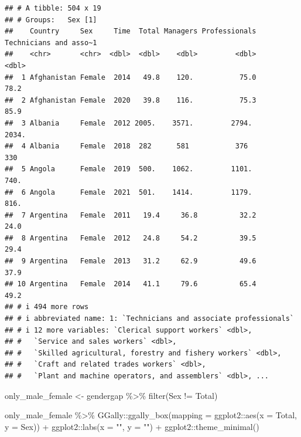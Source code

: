 \documentclass[
]{article}
\newenvironment{Shaded}{\begin{snugshade}}{\end{snugshade}}
\newcommand{\AttributeTok}[1]{\textcolor[rgb]{0.77,0.63,0.00}{#1}}
\newcommand{\FunctionTok}[1]{\textcolor[rgb]{0.00,0.00,0.00}{#1}}
\newcommand{\NormalTok}[1]{#1}
\newcommand{\OtherTok}[1]{\textcolor[rgb]{0.56,0.35,0.01}{#1}}
\newcommand{\SpecialCharTok}[1]{\textcolor[rgb]{0.00,0.00,0.00}{#1}}
\newcommand{\StringTok}[1]{\textcolor[rgb]{0.31,0.60,0.02}{#1}}
\begin{document}
\begin{verbatim}
## # A tibble: 504 x 19
## # Groups:   Sex [1]
##    Country     Sex     Time  Total Managers Professionals Technicians and asso~1
##    <chr>       <chr>  <dbl>  <dbl>    <dbl>         <dbl>                  <dbl>
##  1 Afghanistan Female  2014   49.8    120.           75.0                   78.2
##  2 Afghanistan Female  2020   39.8    116.           75.3                   85.9
##  3 Albania     Female  2012 2005.    3571.         2794.                  2034. 
##  4 Albania     Female  2018  282      581           376                    330  
##  5 Angola      Female  2019  500.    1062.         1101.                   740. 
##  6 Angola      Female  2021  501.    1414.         1179.                   816. 
##  7 Argentina   Female  2011   19.4     36.8          32.2                   24.0
##  8 Argentina   Female  2012   24.8     54.2          39.5                   29.4
##  9 Argentina   Female  2013   31.2     62.9          49.6                   37.9
## 10 Argentina   Female  2014   41.1     79.6          65.4                   49.2
## # i 494 more rows
## # i abbreviated name: 1: `Technicians and associate professionals`
## # i 12 more variables: `Clerical support workers` <dbl>,
## #   `Service and sales workers` <dbl>,
## #   `Skilled agricultural, forestry and fishery workers` <dbl>,
## #   `Craft and related trades workers` <dbl>,
## #   `Plant and machine operators, and assemblers` <dbl>, ...
\end{verbatim}

\begin{Shaded}
\begin{Highlighting}[]
\NormalTok{only\_male\_female }\OtherTok{\textless{}{-}}\NormalTok{ gendergap }\SpecialCharTok{\%\textgreater{}\%}
  \FunctionTok{filter}\NormalTok{(Sex }\SpecialCharTok{!=}\NormalTok{ Total)}

\NormalTok{only\_male\_female }\SpecialCharTok{\%\textgreater{}\%}
\NormalTok{  GGally}\SpecialCharTok{::}\FunctionTok{ggally\_box}\NormalTok{(}\AttributeTok{mapping =}\NormalTok{ ggplot2}\SpecialCharTok{::}\FunctionTok{aes}\NormalTok{(}\AttributeTok{x =}\NormalTok{ Total, }\AttributeTok{y =}\NormalTok{ Sex)) }\SpecialCharTok{+}
\NormalTok{  ggplot2}\SpecialCharTok{::}\FunctionTok{labs}\NormalTok{(}\AttributeTok{x =} \StringTok{""}\NormalTok{, }\AttributeTok{y =} \StringTok{""}\NormalTok{) }\SpecialCharTok{+}
\NormalTok{    ggplot2}\SpecialCharTok{::}\FunctionTok{theme\_minimal}\NormalTok{() }
\end{Highlighting}
\end{Shaded}
\end{document}
